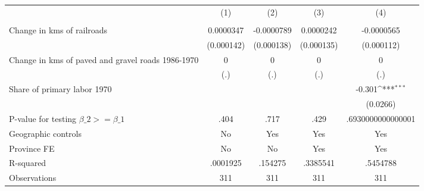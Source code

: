 {
\def\sym#1{\ifmmode^{#1}\else\(^{#1}\)\fi}
\begin{tabular}{l*{4}{c}}
\hline\hline
                &\multicolumn{1}{c}{(1)}&\multicolumn{1}{c}{(2)}&\multicolumn{1}{c}{(3)}&\multicolumn{1}{c}{(4)}\\
                &\multicolumn{1}{c}{}&\multicolumn{1}{c}{}&\multicolumn{1}{c}{}&\multicolumn{1}{c}{}\\
\hline
Change in kms of railroads&0.0000347         &-0.0000789         &0.0000242         &-0.0000565         \\
                &(0.000142)         &(0.000138)         &(0.000135)         &(0.000112)         \\
[1em]
Change in kms of paved and gravel roads 1986-1970&        0         &        0         &        0         &        0         \\
                &      (.)         &      (.)         &      (.)         &      (.)         \\
[1em]
Share of primary labor 1970&                  &                  &                  &   -0.301\sym{***}\\
                &                  &                  &                  & (0.0266)         \\
\hline
P-value for testing $\beta\_{2} >= \beta\_{1}$&     .404         &     .717         &     .429         &.6930000000000001         \\
Geographic controls&       No         &      Yes         &      Yes         &      Yes         \\
Province FE     &       No         &       No         &      Yes         &      Yes         \\
R-squared       & .0001925         &  .154275         & .3385541         & .5454788         \\
Observations    &      311         &      311         &      311         &      311         \\
\hline\hline
\end{tabular}
}

